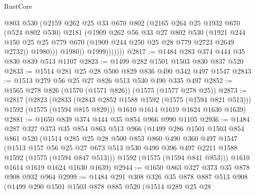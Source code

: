 \begin{lexlean}{RustCore}
\begin{coremodule}
                      @803
                      @530
                      (@2159
                        @262
                        @25
                        @33
                        @670
                        @802
                        (@2165
                          @264
                          @25
                          @1932
                          @670
                          (@524 @802 @530)
                          @2181
                          (@1909
                            @262
                            @56
                            @33
                            @27
                            @802
                            @530
                            (@1921
                              @244
                              @150
                              @25
                              @25
                              @779
                              @670
                              (@1909 @244 @250 @25 @28 @779 @2723 @2649 @2732))
                            @1980)))
                      @1980))
                  @1999)))))))
@2817 := @1484 @283 @374 @444 @35 @830 @839 @513 @1107
@2823 := @1499 @282 @1501 @1503 @830 @837 @520
@2833 := @1514 @281 @25 @28 @500 @829 @836 @490 @342 @497 @1547
@2843 := @1513 @279 @56 @25 @27 @826 @513 @530 @490 @335 @497
@2852 := @1565 @278 @826 (@1570 (@1571 @826)) (@1575 (@1577 @278 @25))
@2873 := @2817
    (@2823
      (@2833 (@2843 @2852 @1588 @1592 (@1575 (@1594 @821 @513))) @1592 (@1575 (@1594 @815 @829)))
      @1610
      @1614
      @1619
      @1624
      @1630
      @1639)
@2881 := @1650 @839 @374 @444 @35 @854 @966 @990 @1105
@2936 := @1484
    @287
    @327
    @373
    @35
    @854
    @863
    @513
    @966
    (@1499
      @286
      @1501
      @1503
      @854
      @861
      @520
      (@1514
        @285
        @25
        @28
        @500
        @853
        @860
        @490
        @360
        @497
        @1547
        (@1513
          @157
          @56
          @25
          @27
          @673
          @513
          @530
          @490
          @396
          @497
          @2211
          @1588
          @1592
          (@1575 (@1594 @847 @513)))
        @1592
        (@1575 (@1594 @841 @853)))
      @1610
      @1614
      @1619
      @1624
      @1630
      @1639)
@2944 := @1650 @863 @327 @373 @35 @878 @908 @932 @964
@2999 := @1484
    @291
    @308
    @326
    @35
    @878
    @887
    @513
    @908
    (@1499
      @290
      @1501
      @1503
      @878
      @885
      @520
      (@1514
        @289
        @25
        @28

\end{coremodule}
\end{lexlean}
